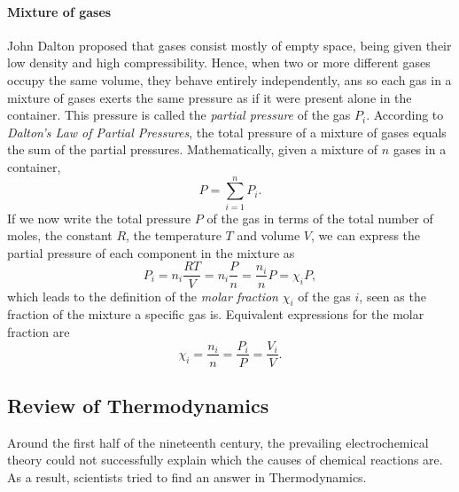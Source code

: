 \documentclass[a4paper,10pt]{article}
\theoremstyle{plain}
\theoremstyle{definition}
\theoremstyle{remark}
\begin{document}
\paragraph{Mixture of gases}John Dalton proposed that gases consist mostly of empty space, being given their low density and high compressibility. Hence, when two or more different gases occupy the same volume, they behave entirely independently, ans so each gas in a mixture of gases exerts the same pressure as if it were present alone in the container. This pressure is called the \textit{partial pressure} of the gas $P_i$. According to \textit{Dalton's Law of Partial Pressures}, the total pressure of a mixture of gases equals the sum of the partial pressures. Mathematically, given a mixture of $n$ gases in a container,
\begin{equation}
P = \sum_{i = 1}^n P_i.
\end{equation}
If we now write the total pressure $P$ of the gas in terms of the total number of moles, the constant $R$, the temperature $T$ and volume $V$, we can express the partial pressure of each component in the mixture as
\begin{equation}
P_i = n_i\frac{RT}{V} = n_i\frac{P}{n} = \frac{n_i}{n}P = \chi_i P,
\end{equation}
which leads to the definition of the \textit{molar fraction} $\chi_i$ of the gas $i$, seen as the fraction of the mixture a specific gas is. Equivalent expressions for the molar fraction are
\begin{equation}
\chi_i = \frac{n_i}{n} = \frac{P_i}{P} = \frac{V_i}{V}.
\end{equation}
\subsection{Review of Thermodynamics}
Around the first half of the nineteenth century, the prevailing electrochemical theory could not successfully explain which the causes of chemical reactions are. As a result, scientists tried to find an answer in Thermodynamics.
\end{document}
